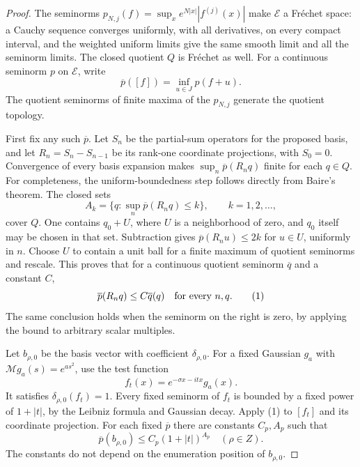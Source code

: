 \documentclass[11pt,a4paper]{article}
\begin{document}
\begin{proof}
The seminorms $p_{N,j}(f)=\sup_x e^{N|x|}|f^{(j)}(x)|$ make
$\mathcal E$ a Fr\'echet space: a Cauchy sequence converges uniformly,
with all derivatives, on every compact interval, and the weighted
uniform limits give the same smooth limit and all the seminorm
limits. The closed quotient $Q$ is Fr\'echet as well.
For a continuous seminorm $p$ on $\mathcal E$, write
\[
 \overline p([f])=\inf_{u\in J}p(f+u).
\]
The quotient seminorms of finite maxima of the $p_{N,j}$ generate
the quotient topology.

First fix any such $\overline p$. Let $S_n$ be the partial-sum
operators for the proposed basis, and let $R_n=S_n-S_{n-1}$ be
its rank-one coordinate projections, with $S_0=0$.
Convergence of every basis expansion makes
$\sup_n\overline p(R_nq)$ finite for each $q\in Q$.
For completeness, the uniform-boundedness step follows directly
from Baire's theorem. The closed sets
\[
 A_k=\{q:\sup_n\overline p(R_nq)\le k\},\qquad k=1,2,\ldots,
\]
cover $Q$. One contains $q_0+U$, where $U$ is a neighborhood of
zero, and $q_0$ itself may be chosen in that set. Subtraction
gives $\overline p(R_nu)\le2k$ for $u\in U$, uniformly in $n$.
Choose $U$ to contain a unit ball for a finite maximum of
quotient seminorms and rescale. This proves that for a continuous
quotient seminorm $\overline q$ and a constant $C$,
\[
             \overline p(R_nq)\le C\overline q(q)
                         \quad\hbox{for every }n,q.    \tag{1}
\]
The same conclusion holds when the seminorm on the right is
zero, by applying the bound to arbitrary scalar multiples.

Let $b_{\rho,0}$ be the basis vector with coefficient
$\delta_{\rho,0}$. For a fixed Gaussian $g_a$ with
$\mathcal Mg_a(s)=e^{as^2}$, use the test function
\[
                f_t(x)=e^{-\sigma x-itx}g_a(x).
\]
It satisfies $\delta_{\rho,0}(f_t)=1$.
Every fixed seminorm of $f_t$ is bounded by a fixed power of
$1+|t|$, by the Leibniz formula and Gaussian decay.
Apply (1) to $[f_t]$ and its coordinate projection. For each
fixed $\overline p$ there are constants $C_p,A_p$ such that
\[
       \overline p(b_{\rho,0})\le C_p(1+|t|)^{A_p}
                                      \quad(\rho\in Z). \tag{2}
\]
The constants do not depend on the enumeration position of
$b_{\rho,0}$.


\end{proof}
\end{document}
